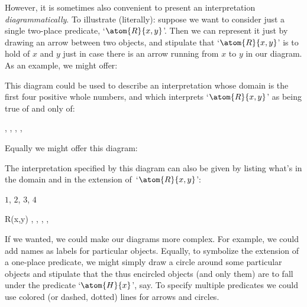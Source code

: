 However, it is sometimes also convenient to present an interpretation \emph{diagrammatically}. To illustrate (literally): suppose we want to consider just a single two-place predicate, `$\atom{R}{x,y}$'. Then we can represent it just by drawing an arrow between two objects, and stipulate that `$\atom{R}{x,y}$' is to hold of $x$ and $y$ just in case there is an arrow running from $x$ to $y$ in our diagram. As an example, we might offer:
\begin{center}
\end{center}
This diagram could be used to describe an interpretation whose domain is the first four positive whole numbers, and which interprets `$\atom{R}{x,y}$' as being true of and only of:
	\begin{center}
		, 
		, 
		, 
		, 
	\end{center}
Equally we might offer this diagram:

\begin{center}
\end{center}

The interpretation specified by this diagram can also be given by listing what's in the domain and in the extension of~`$\atom{R}{x,y}$':
	\begin{ekey}
	\item[\text{domain}] $1$, $2$, $3$, $4$
	\item[R(x,y)] , 
		, 
		, 
		,
	\end{ekey}
If we wanted, we could make our diagrams more complex. For example, we could add names as labels for particular objects. Equally, to symbolize the extension of a one-place predicate, we might simply draw a circle around some particular objects and stipulate that the thus encircled objects (and only them) are to fall under the predicate `$\atom{H}{x}$', say. To specify multiple predicates we could use colored (or dashed, dotted) lines for arrows and circles.


